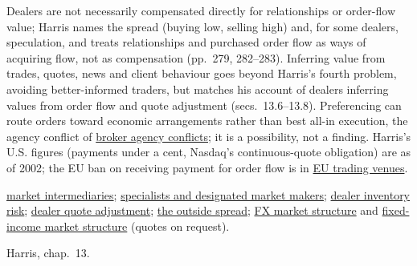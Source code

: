 \begin{qfdefinition}
 Dealers are not necessarily compensated directly for relationships or order-flow value; Harris names the spread (buying low, selling high) and, for some dealers, speculation, and treats relationships and purchased order flow as ways of acquiring flow, not as compensation (pp.~279, 282--283). Inferring value from trades, quotes, news and client behaviour goes beyond Harris's fourth problem, avoiding better-informed traders, but matches his account of dealers inferring values from order flow and quote adjustment (secs.~13.6--13.8). Preferencing can route orders toward economic arrangements rather than best all-in execution, the agency conflict of \hyperref[def:broker-agency-conflicts]{broker agency conflicts}; it is a possibility, not a finding. Harris's U.S. figures (payments under a cent, Nasdaq's continuous-quote obligation) are as of 2002; the EU ban on receiving payment for order flow is in \hyperref[rule:eu-trading-venue-transparency]{EU trading venues}.

 \hyperref[def:market-intermediaries]{market intermediaries}; \hyperref[def:specialist-obligations-privileges]{specialists and designated market makers}; \hyperref[def:dealer-inventory-risk]{dealer inventory risk}; \hyperref[meth:dealer-quote-adjustment]{dealer quote adjustment}; \hyperref[def:outside-spread]{the outside spread}; \hyperref[def:fx-market-structure]{FX market structure} and \hyperref[def:fixed-income-market-structure]{fixed-income market structure} (quotes on request).

 Harris, chap.~13.

\end{qfdefinition}

